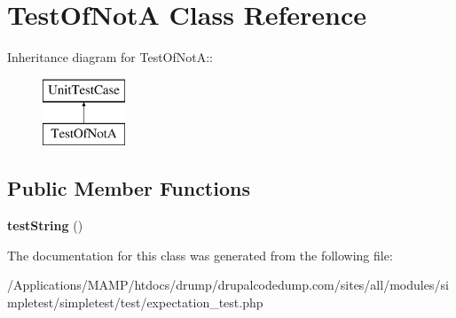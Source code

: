 \hypertarget{class_test_of_not_a}{
\section{TestOfNotA Class Reference}
\label{class_test_of_not_a}
}
Inheritance diagram for TestOfNotA::\begin{figure}[H]
\begin{center}
\leavevmode
\includegraphics[height=2cm]{class_test_of_not_a}
\end{center}
\end{figure}
\subsection*{Public Member Functions}
\begin{DoxyCompactItemize}
\item 
\hypertarget{class_test_of_not_a_af5ab2384171abbeaa4cdf934eb711764}{
{\bfseries testString} ()}
\label{class_test_of_not_a_af5ab2384171abbeaa4cdf934eb711764}

\end{DoxyCompactItemize}


The documentation for this class was generated from the following file:\begin{DoxyCompactItemize}
\item 
/Applications/MAMP/htdocs/drump/drupalcodedump.com/sites/all/modules/simpletest/simpletest/test/expectation\_\-test.php\end{DoxyCompactItemize}
